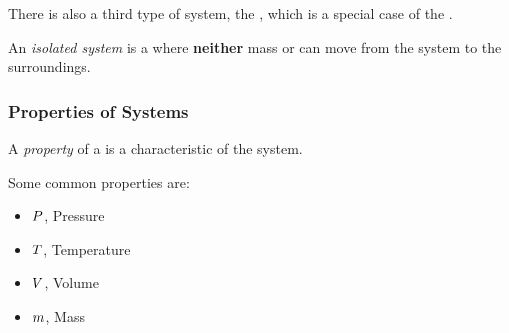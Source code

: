There is also a third type of system, the , which is a special case of the .
\begin{definition}\label{def:Isolated_System}
  An \emph{isolated system} is a  where \textbf{neither} mass or  can move from the system to the surroundings.
\end{definition}

\subsubsection{Properties of Systems}\label{subsubsec:Properties_Systems}
\begin{definition}[Property]\label{def:Property}
  A \emph{property} of a  is a characteristic of the system.
\end{definition}

Some common properties are:
\begin{itemize}[noitemsep]
\item $P$, Pressure
\item $T$, Temperature
\item $V$, Volume
\item $m$, Mass
\end{itemize}



